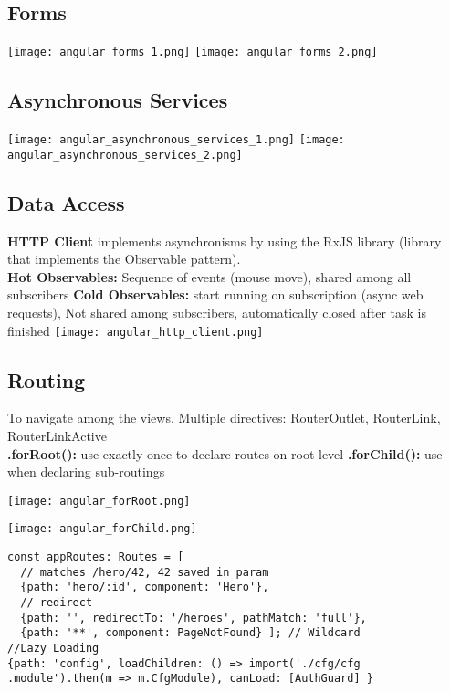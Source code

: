 \subsection{Forms}
\texttt{[image: angular\_forms\_1.png]}
\texttt{[image: angular\_forms\_2.png]}
\subsection{Asynchronous Services}
\texttt{[image: angular\_asynchronous\_services\_1.png]}
\texttt{[image: angular\_asynchronous\_services\_2.png]}
\subsection{Data Access}
\textcolor{b}{\textbf{HTTP Client}} implements asynchronisms by using the RxJS library (library that implements the Observable pattern).\\
\textbf{Hot Observables:} Sequence of events (mouse move), shared among all subscribers \textbf{Cold Observables:} start running on subscription (async web requests), Not shared among subscribers, automatically closed after task is finished
\texttt{[image: angular\_http\_client.png]}
\subsection{Routing}
To navigate among the views. Multiple directives: \textcolor{b}{RouterOutlet, RouterLink, RouterLinkActive}\\
\textbf{.forRoot():} use exactly once to declare routes on root level \textbf{.forChild():} use when declaring sub-routings\\
\begin{minipage}{0.5\linewidth}
    \texttt{[image: angular\_forRoot.png]}
\end{minipage}
\begin{minipage}{0.5\linewidth}
    \texttt{[image: angular\_forChild.png]}
\end{minipage}
\begin{lstlisting}[style=htmlcssjs]
const appRoutes: Routes = [
  // matches /hero/42, 42 saved in param
  {path: 'hero/:id', component: 'Hero'},
  // redirect
  {path: '', redirectTo: '/heroes', pathMatch: 'full'},
  {path: '**', component: PageNotFound} ]; // Wildcard
//Lazy Loading
{path: 'config', loadChildren: () => import('./cfg/cfg
.module').then(m => m.CfgModule), canLoad: [AuthGuard] }
\end{lstlisting}
